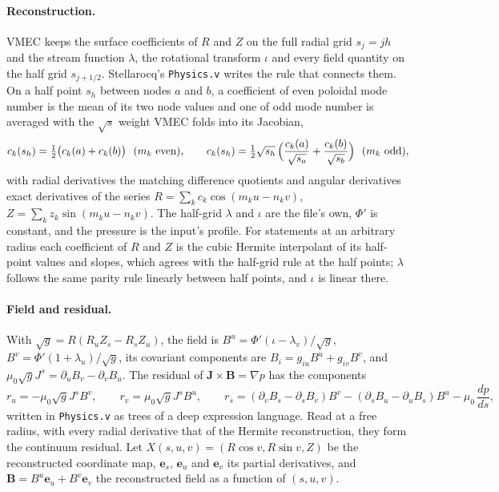 \documentclass[11pt]{article}
\newcommand{\code}[1]{\texttt{#1}}
\newcommand{\sqg}{\sqrt{g}}
\begin{document}
\paragraph{Reconstruction.}
VMEC keeps the surface coefficients of $R$ and $Z$ on the full radial grid
$s_j = jh$ and the stream function $\lambda$, the rotational transform $\iota$
and every field quantity on the half grid $s_{j+1/2}$. Stellarocq's
\code{Physics.v} writes the rule that connects them. On a half point $s_h$
between nodes $a$ and $b$, a coefficient of even poloidal mode number is the
mean of its two node values and one of odd mode number is averaged with the
$\sqrt{s}$ weight VMEC folds into its Jacobian,
\begin{equation}
c_k(s_h) = {\textstyle\frac12}\bigl(c_k(a)+c_k(b)\bigr)\ \ (m_k \mbox{ even}),\qquad
c_k(s_h) = {\textstyle\frac12}\sqrt{s_h}\,\Bigl(\frac{c_k(a)}{\sqrt{s_a}}+\frac{c_k(b)}{\sqrt{s_b}}\Bigr)\ \ (m_k \mbox{ odd}),
\end{equation}
with radial derivatives the matching difference quotients and angular
derivatives exact derivatives of the series $R=\sum_k c_k\cos(m_k u-n_k v)$,
$Z=\sum_k z_k\sin(m_k u-n_k v)$. The half-grid $\lambda$ and $\iota$ are the
file's own, $\Phi'$ is constant, and the pressure is the input's profile. For
statements at an arbitrary radius each coefficient of $R$ and $Z$ is the cubic
Hermite interpolant of its half-point values and slopes, which agrees with the
half-grid rule at the half points; $\lambda$ follows the same parity rule
linearly between half points, and $\iota$ is linear there.

\paragraph{Field and residual.}
With $\sqg = R(R_uZ_s-R_sZ_u)$, the field is
$B^u=\Phi'(\iota-\lambda_v)/\sqg$, $B^v=\Phi'(1+\lambda_u)/\sqg$, its covariant
components are $B_i=g_{iu}B^u+g_{iv}B^v$, and
$\mu_0\sqg J^s=\partial_uB_v-\partial_vB_u$. The residual of
$\mathbf{J}\times\mathbf{B}=\nabla p$ has the components
\begin{equation}
r_u = -\mu_0\sqg J^s B^v,\qquad r_v = \mu_0\sqg J^s B^u,\qquad
r_s = (\partial_vB_s-\partial_sB_v)B^v-(\partial_sB_u-\partial_uB_s)B^u-\mu_0\,\frac{dp}{ds},
\end{equation}
written in \code{Physics.v} as trees of a deep expression language. Read at a
free radius, with every radial derivative that of the Hermite reconstruction,
they form the continuum residual. Let $X(s,u,v)=(R\cos v,R\sin v,Z)$ be the
reconstructed coordinate map, $\mathbf{e}_s$, $\mathbf{e}_u$ and $\mathbf{e}_v$
its partial derivatives, and $\mathbf{B}=B^u\mathbf{e}_u+B^v\mathbf{e}_v$ the
reconstructed field as a function of $(s,u,v)$.
\end{document}
